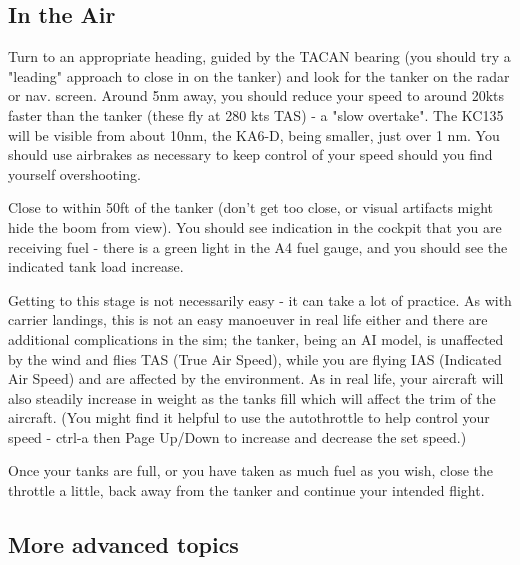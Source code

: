 \subsection{In the Air}

Turn to an appropriate heading, guided by the TACAN bearing (you should
try a "leading" approach to close in on the tanker) and look for the
tanker on the radar or nav. screen.  Around 5nm away, you should reduce
your speed to around 20kts faster than the tanker (these fly at 280 kts
TAS) - a "slow overtake".  The KC135 will be visible from about 10nm,
the KA6-D, being smaller, just over 1 nm.  You should use airbrakes as
necessary to keep control of your speed should you find yourself
overshooting.

Close to within 50ft of the tanker (don't get too close, or visual
artifacts might hide the boom from view).  You should see indication in
the cockpit that you are receiving fuel - there is a green light in the
A4 fuel gauge, and you should see the indicated tank load increase.

Getting to this stage is not necessarily easy - it can take a lot of
practice.  As with carrier landings, this is not an easy manoeuver in
real life either and there are additional complications in the sim; the
tanker, being an AI model, is unaffected by the wind and flies TAS
(True Air Speed), while you are flying IAS (Indicated Air Speed) and
are affected by the environment.  As in real life, your aircraft will
also steadily increase in weight as the tanks fill which will affect
the trim of the aircraft. (You might find it helpful to use the
autothrottle to help control your speed - ctrl-a then Page Up/Down to
increase and decrease the set speed.)

Once your tanks are full, or you have taken as much fuel as you wish,
close the throttle a little, back away from the tanker and continue
your intended flight.

\subsection{More advanced topics}

